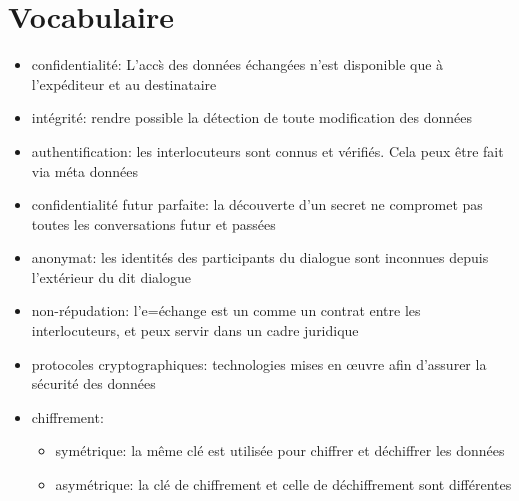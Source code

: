 \section{Vocabulaire}
\begin{itemize}
  \item confidentialit\'e: L'acc\`s des donn\'ees \'echang\'ees n'est disponible que \`a l'exp\'editeur et au
  destinataire
  \item int\'egrit\'e: rendre possible la d\'etection de toute modification des donn\'ees
  \item authentification: les interlocuteurs sont connus et v\'erifi\'es. Cela peux \^etre fait via m\'eta donn\'ees
  \item confidentialit\'e futur parfaite: la d\'ecouverte d'un secret ne compromet pas toutes les conversations futur et
  pass\'ees
  \item anonymat: les identit\'es des participants du dialogue sont inconnues depuis l'ext\'erieur du dit dialogue
  \item non-r\'epudation: l'e=\'echange est un comme un contrat entre les interlocuteurs, et peux servir dans un cadre
  juridique
  \item protocoles cryptographiques: technologies mises en \oe{}uvre afin d'assurer la s\'ecurit\'e des donn\'ees
  \item chiffrement:
  \begin{itemize}
    \item sym\'etrique: la m\^eme cl\'e est utilis\'ee pour chiffrer et d\'echiffrer les donn\'ees
    \item asym\'etrique: la cl\'e de chiffrement et celle de d\'echiffrement sont diff\'erentes
  \end{itemize}
\end{itemize}
